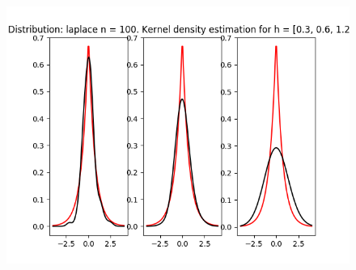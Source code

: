 \documentclass[12pt]{article}
\begin{document}
\begin{center}
\begin{figure}[H]
\includegraphics[width=\textwidth]{kernel/d_laplace100.png}
\end{figure}


\end{center}
\end{document}
